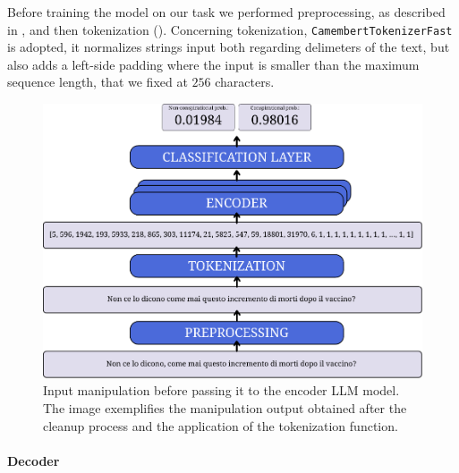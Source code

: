 \documentclass[11pt]{article}
\begin{document}
Before training the model on our task we performed preprocessing, as described in ,
and then tokenization ().
%
Concerning tokenization, \texttt{CamembertTokenizerFast} is adopted, 
it normalizes strings input both regarding delimeters of the text, 
but also adds a left-side padding where the input is smaller than the maximum sequence length,
that we fixed at $ 256 $ characters.
%
\begin{figure}
  \centering
  \includegraphics[width=\linewidth]{figures/encoder.pdf}
  \caption{
    Input manipulation before passing it to the encoder LLM model. 
    The image exemplifies the manipulation output obtained after the cleanup process and the application of the tokenization function.
  }
  \label{fig:preprocessing-and-tokenization-encoder}
\end{figure}

\paragraph{Decoder} 
\end{document}
